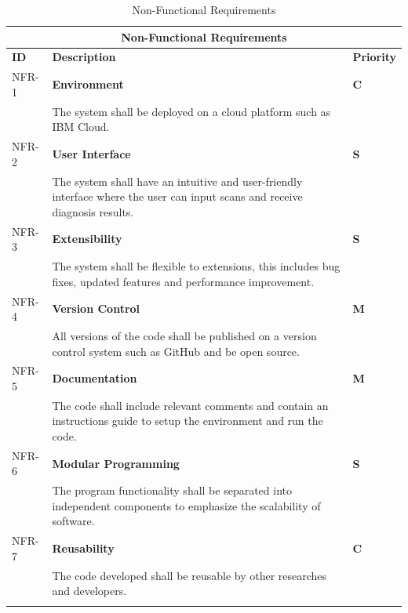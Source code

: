 \begin{longtable}{| p{} | p{} | p{} |} 
  
  \hline
  \multicolumn{3}{|c|}{\textbf{Non-Functional Requirements}}\\
  \hline
  \textbf{ID} & \textbf{Description} & \textbf{Priority}  \\
  \hline
  NFR-1 & \textbf{Environment}  & \cellcolor{yellow}\textbf{C} \\ & The system shall be deployed on a cloud platform such as IBM Cloud. & \cellcolor{yellow} \\ \hline 
  NFR-2 & \textbf{User Interface}  & \cellcolor{cyan}\textbf{S} \\ &   The system shall have an intuitive and user-friendly interface where the user can input scans and receive diagnosis results. & \cellcolor{cyan} \\ \hline 
  NFR-3 & \textbf{Extensibility}  & \cellcolor{cyan}\textbf{S} \\ & The system shall be flexible to extensions, this includes bug fixes, updated features and performance improvement.& \cellcolor{cyan} \\ \hline 
  NFR-4 & \textbf{Version Control}  & \cellcolor{green}\textbf{M} \\ & All versions of the code shall be published on a version control system such as GitHub and be open source.& \cellcolor{green} \\ \hline 
  NFR-5 & \textbf{Documentation}  & \cellcolor{green}\textbf{M} \\ & The code shall include relevant comments and contain an instructions guide to setup the environment and run the code. & \cellcolor{green} \\ \hline 
  NFR-6 & \textbf{Modular Programming}  & \cellcolor{cyan}\textbf{S} \\ & The program functionality shall be separated into independent components to emphasize the scalability of software.& \cellcolor{cyan} \\ \hline 
  NFR-7 & \textbf{Reusability}  & \cellcolor{yellow}\textbf{C} \\ & The code developed shall be reusable by other researches and developers. & \cellcolor{yellow} \\ \hline 

  \caption{Non-Functional Requirements}
  
    \label{tab:Non-Functional Requirements}
    \end{longtable}



